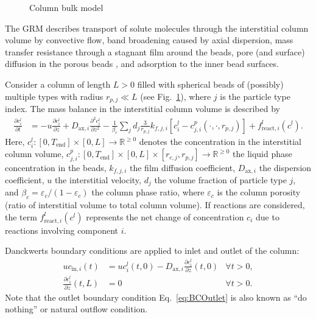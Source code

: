 \begin{figure}[!htb]
{
	}
	\caption{Column bulk model\label{fig:ModelGRMColumn}}
\end{figure}

The GRM describes transport of solute molecules through the interstitial column volume by convective flow, band broadening caused by axial dispersion, mass transfer resistance through a stagnant film around the beads, pore (and surface) diffusion in the porous beads \cite{Ma1996, Schneider1968a, Miyabe2007}, and adsorption to the inner bead surfaces.

Consider a column of length $L>0$ filled with spherical beads of (possibly) multiple types with radius $r_{p,j} \ll L$ (see Fig.~\ref{fig:ModelGRMColumn}), where $j$ is the particle type index. 
The mass balance in the interstitial column volume is described by
\begin{align}
	\frac{\partial c^l_i}{\partial t} &= -u \frac{\partial c^l_i}{\partial z} + D_{\text{ax},i} \frac{\partial^2 c^l_i}{\partial z^2} - \frac{1}{\beta_c} \sum_j d_j \frac{3}{r_{p,j}} k_{f,j,i} \left[ c^l_i - c^p_{j,i}(\cdot, \cdot, r_{p,j}) \right] + f_{\text{react},i}^l\left(c^l\right). \label{eq:ModelColumn}
\end{align}
Here, $c^l_i\colon \left[0, T_{\text{end}}\right] \times [0, L] \rightarrow \mathds{R}^{\geq 0}$ denotes the concentration in the interstitial column volume, $c^p_{j,i}\colon \left[0, T_{\text{end}}\right] \times [0, L] \times [r_{c,j}, r_{p,j}] \rightarrow \mathds{R}^{\geq 0}$ the liquid phase concentration in the beads, $k_{f,j,i}$ the film diffusion coefficient, $D_{\text{ax},i}$ the dispersion coefficient, $u$ the interstitial velocity, $d_j$ the volume fraction of particle type $j$, and $\beta_c = \varepsilon_c / (1 - \varepsilon_c)$ the column phase ratio, where $\varepsilon_c$ is the column porosity (ratio of interstitial volume to total column volume).
If reactions are considered, the term $f_{\text{react},i}^l\left(c^l\right)$ represents the net change of concentration $c_i$ due to reactions involving component $i$.

Danckwerts boundary conditions \cite{Danckwerts1953} are applied to inlet and outlet of the column:
\begin{align}
	u c_{\text{in},i}(t) &= u c^l_i(t,0) - D_{\text{ax},i} \frac{\partial c^l_i}{\partial z}(t, 0) \label{eq:BCInlet} & \forall t > 0,\\
	\frac{\partial c^l_i}{\partial z}(t, L) &= 0 & \forall t > 0. \label{eq:BCOutlet}
\end{align}
Note that the outlet boundary condition Eq.~\eqref{eq:BCOutlet} is also known as ``do nothing'' or natural outflow condition.

